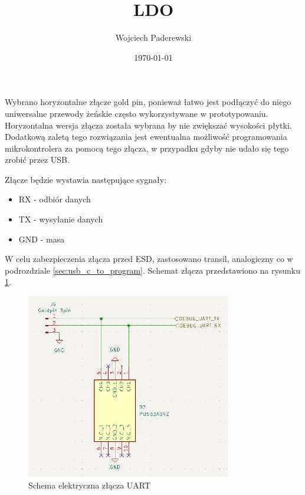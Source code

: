 \documentclass[../../main.tex]{subfiles}
\author{Wojciech Paderewski}
\date{\today}
\title{LDO}
\begin{document}
Wybrano horyzontalne złącze gold pin, ponieważ łatwo jest podłączyć do niego uniwersalne przewody żeńskie często wykorzystywane w prototypowaniu.
Horyzontalna wersja złącza została wybrana by nie zwiększać wysokości płytki. Dodatkową zaletą tego rozwiązania jest ewentualna możliwość programowania
mikrokontrolera za pomocą tego złącza, w przypadku gdyby nie udało się tego zrobić przez USB. 

Złącze będzie wystawia następujące sygnały:
\begin{itemize}
    \item RX - odbiór danych
    \item TX - wysyłanie danych
    \item GND - masa
\end{itemize}

W celu zabezpieczenia złącza przed ESD, zastosowano transil, analogiczny co w podrozdziale \ref{sec:usb_c_to_program}.
Schemat złącza przedstawiono na rysunku \ref{fig:uart}.

\begin{figure}[H]
    \centering
    \includegraphics[width=0.8\textwidth]{uart.png}
    \caption{Schema elektryczna złącza UART}
    \label{fig:uart}
\end{figure}
\end{document}
